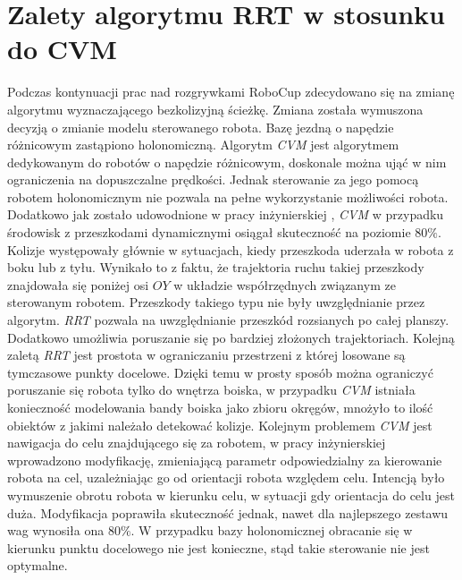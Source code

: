 \section{Zalety algorytmu RRT w stosunku \\do CVM}
Podczas kontynuacji prac nad rozgrywkami RoboCup zdecydowano się na zmianę algorytmu wyznaczającego bezkolizyjną ścieżkę. Zmiana została wymuszona decyzją o zmianie
modelu sterowanego robota. Bazę jezdną o napędzie różnicowym zastąpiono holonomiczną. Algorytm \textit{CVM} jest algorytmem dedykowanym do robotów o napędzie różnicowym, doskonale
można ująć w nim ograniczenia na dopuszczalne prędkości. Jednak sterowanie za jego pomocą robotem holonomicznym nie pozwala na pełne wykorzystanie możliwości robota.
Dodatkowo jak zostało udowodnione w pracy inżynierskiej \cite{inzynierka}, \textit{CVM} w przypadku środowisk z przeszkodami dynamicznymi osiągał skuteczność na poziomie $80\%$. Kolizje występowały 
głównie w sytuacjach, kiedy przeszkoda uderzała w robota z boku lub z tyłu. Wynikało to z faktu, że trajektoria ruchu takiej przeszkody znajdowała się poniżej osi $OY$ w układzie współrzędnych
związanym ze sterowanym robotem. Przeszkody takiego typu nie były uwzględnianie przez algorytm.
\textit{RRT} pozwala na uwzględnianie przeszkód rozsianych po całej planszy. Dodatkowo umożliwia poruszanie się po bardziej złożonych trajektoriach.
Kolejną zaletą \textit{RRT} jest prostota w ograniczaniu przestrzeni z której losowane są tymczasowe punkty docelowe. Dzięki temu w prosty sposób można ograniczyć poruszanie
się robota tylko do wnętrza boiska, w przypadku \textit{CVM} istniała konieczność modelowania bandy boiska jako zbioru okręgów, mnożyło to ilość obiektów z jakimi należało detekować
kolizje.
Kolejnym problemem \textit{CVM} jest nawigacja do celu znajdującego się za robotem, w pracy inżynierskiej wprowadzono modyfikację, zmieniającą parametr odpowiedzialny za kierowanie
robota na cel, uzależniając go od orientacji robota względem celu. Intencją było wymuszenie obrotu robota w kierunku celu, w sytuacji gdy orientacja do celu jest duża.
Modyfikacja poprawiła skuteczność jednak, nawet dla najlepszego zestawu wag wynosiła ona $80\%$. W przypadku bazy holonomicznej obracanie się w kierunku punktu docelowego nie jest
konieczne, stąd takie sterowanie nie jest optymalne.